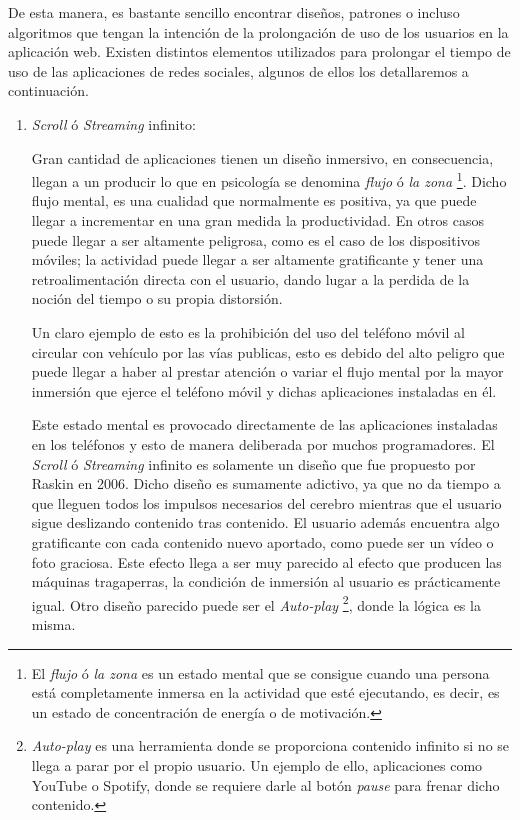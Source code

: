 \vspace{0.3cm}

De esta manera, es bastante sencillo encontrar diseños, patrones o incluso algoritmos que tengan la intención de la prolongación de uso de los usuarios en la aplicación web. Existen distintos elementos utilizados para prolongar el tiempo de uso de las aplicaciones de redes sociales, algunos de ellos los detallaremos a continuación. \cite{Adiccion-RRSS-Features}

\begin{enumerate}

    \item
    \textit{Scroll} ó \textit{Streaming} infinito:
    
    Gran cantidad de aplicaciones tienen un diseño inmersivo, en consecuencia, llegan a un producir lo que en psicología se denomina \textit{flujo} ó \textit{la zona} \footnote{El \textit{flujo} ó \textit{la zona} es un estado mental que se consigue cuando una persona está completamente inmersa en la actividad que esté ejecutando, es decir, es un estado de concentración de energía o de motivación.}. Dicho flujo mental, es una cualidad que normalmente es positiva, ya que puede llegar a incrementar en una gran medida la productividad. En otros casos puede llegar a ser altamente peligrosa, como es el caso de los dispositivos móviles; la actividad puede llegar a ser altamente gratificante y tener una retroalimentación directa con el usuario, dando lugar a la perdida de la noción del tiempo o su propia distorsión.
    
    Un claro ejemplo de esto es la prohibición del uso del teléfono móvil al circular con vehículo por las vías publicas, esto es debido del alto peligro que puede llegar a haber al prestar atención o variar el flujo mental por la mayor inmersión que ejerce el teléfono móvil y dichas aplicaciones instaladas en él.

    Este estado mental es provocado directamente de las aplicaciones instaladas en los teléfonos y esto de manera deliberada por muchos programadores. El \textit{Scroll} ó \textit{Streaming} infinito es solamente un diseño que fue propuesto por Raskin en 2006. Dicho diseño es sumamente adictivo, ya que no da tiempo a que lleguen todos los impulsos necesarios del cerebro mientras que el usuario sigue deslizando contenido tras contenido. El usuario además encuentra algo gratificante con cada contenido nuevo aportado, como puede ser un vídeo o foto graciosa. Este efecto llega a ser muy parecido al efecto que producen las máquinas tragaperras, la condición de inmersión al usuario es prácticamente igual. Otro diseño parecido puede ser el \textit{Auto-play} \footnote{\textit{Auto-play} es una herramienta donde se proporciona contenido infinito si no se llega a parar por el propio usuario. Un ejemplo de ello, aplicaciones como YouTube o Spotify, donde se requiere darle al botón \textit{pause} para frenar dicho contenido.}, donde la lógica es la misma.


\end{enumerate}
